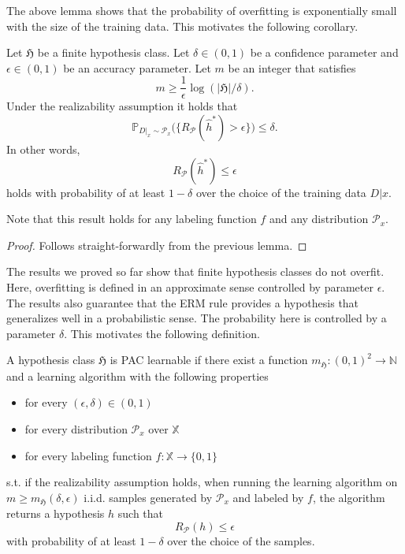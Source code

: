 The above lemma shows that the probability of overfitting is exponentially small
with the size of the training data. This motivates the following corollary.
    \begin{coro}
		\label{Coro:finite_hypo}
		Let $\mathfrak{H}$ be a finite hypothesis class. Let $\delta \in (0,1)$ be a confidence parameter and $\epsilon \in
		(0,1)$ be an accuracy parameter. Let $m$ be an integer that satisfies
		$$
		m \geq \frac{1}{\epsilon} \log(|\mathfrak{H}|/\delta).
		$$ 	
		Under the realizability assumption it holds that 
		$$
		\mathbb{P}_{D|_x \sim \mathcal{P}_x} \bigl( \{ R_\mathcal{P}(\hat{h}^*) > \epsilon \}\bigr) \leq \delta.
		$$
		In other words, 
		$$
		R_\mathcal{P}(\hat{h}^*) \leq \epsilon
		$$
		holds with probability of at least $1-\delta$ over the choice of the
		training data $D|x$.
	\end{coro}
	Note that this result holds for any labeling function $f$ and any
	distribution $\mathcal{P}_x$. 
    \begin{proof}
        Follows straight-forwardly from the previous lemma.
    \end{proof}
The results we proved so far show that finite hypothesis classes do not overfit.
Here, overfitting is defined in an approximate sense controlled by parameter
$\epsilon$. The results also guarantee that the ERM rule provides a hypothesis
that generalizes well in a probabilistic sense. The probability here is
controlled by a parameter $\delta$. This motivates the following definition.

    \begin{definition}
		A hypothesis class $\mathfrak{H}$ is PAC learnable if there exist a
		function $m_\mathfrak{H}: (0,1)^2 \to \mathbb{N}$ and a learning
		algorithm with the following properties
		\begin{itemize}
			\item for every $(\epsilon, \delta) \in (0,1)$
			\item for every distribution $\mathcal{P}_x$ over $\mathbb{X}$
			\item for every labeling function $f: \mathbb{X} \to \{0,1\}$
		\end{itemize}
		s.t. if the realizability assumption holds, when running the learning
		algorithm on $m \geq m_\mathfrak{H}(\delta, \epsilon)$ i.i.d. samples
		generated by $\mathcal{P}_x$ and labeled by $f$, the algorithm returns a
		hypothesis $h$ such that 
		$$
		R_\mathcal{P}(h) \leq \epsilon
		$$ 
		with probability of at least $1-\delta$ over the choice of the samples.
	\end{definition}

